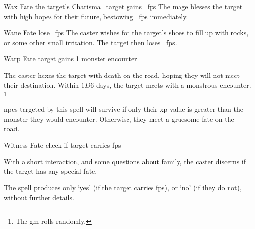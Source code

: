   {}%
  {Wax}%
  {Fate}%
  {the target's Charisma}%
  {\spellArea~target gains \showDam~\glspl{fp}}%
  {
    The mage blesses the target with high hopes for their future, bestowing \showDam~\glspl{fp} immediately.
  }

  {}%
  {Wane}%
  {Fate}%
  {}%
  {lose \showDam~\glspl{fp}}%
  {
    The caster wishes for the target's shoes to fill up with rocks, or some other small irritation.
    The target then loses \showDam~\glspl{fp}.
  }


  {}%
  {Warp}%
  {Fate}%
  {}%
  {target gains 1 monster encounter}%
  {
    The caster hexes the target with death on the road, hoping they will not meet their destination.
    Within $1D6$ days, the target meets with a monstrous encounter.%
    \footnote{The \gls{gm} rolls randomly.}

    \Glspl{npc} targeted by this spell will survive if only their \gls{xp} value is greater than the monster they would encounter.
    Otherwise, they meet a gruesome fate on the road.
  }

  {}%
  {Witness}%
  {Fate}%
  {}%
  {check if target carries \glspl{fp}}%
  {
    With a short interaction, and some questions about family, the caster discerns if the target has any special fate.

    The spell produces only `yes' (if the target carries \glspl{fp}), or `no' (if they do not), without further details.
  }

